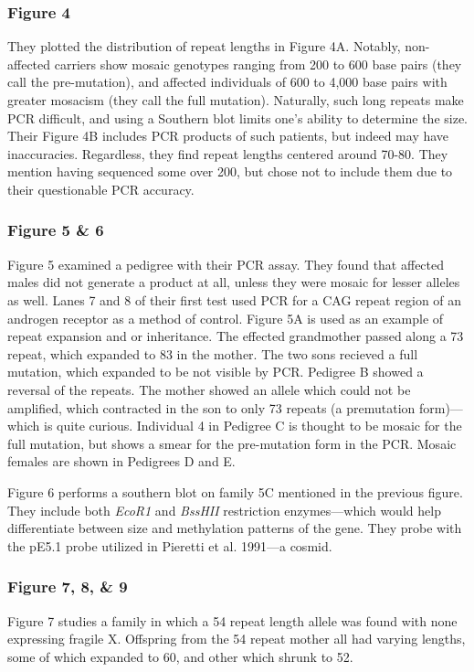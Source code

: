 \documentclass[12pt]{report}
\begin{document}
\subsubsection{Figure 4} 
They plotted the distribution of repeat lengths in Figure 4A. Notably, non-affected carriers show mosaic genotypes ranging from 200 to 600 base pairs (they call the pre-mutation), and affected individuals of 600 to 4,000 base pairs with greater mosacism (they call the full mutation). Naturally, such long repeats make PCR difficult, and using a Southern blot limits one's ability to determine the size. Their Figure 4B includes PCR products of such patients, but indeed may have inaccuracies. Regardless, they find repeat lengths centered around 70-80. They mention having sequenced some over 200, but chose not to include them due to their questionable PCR accuracy.

\subsubsection{Figure 5 \& 6}

Figure 5 examined a pedigree with their PCR assay. They found that affected males did not generate a product at all, unless they were mosaic for lesser alleles as well. Lanes 7 and 8 of their first test used PCR for a CAG repeat region of an androgen receptor as a method of control. Figure 5A is used as an example of repeat expansion and or inheritance. The effected grandmother passed along a 73 repeat, which expanded to 83 in the mother. The two sons recieved a full mutation, which expanded to be not visible by PCR. Pedigree B showed a reversal of the repeats. The mother showed an allele which could not be amplified, which contracted in the son to only 73 repeats (a premutation form)---which is quite curious. Individual 4 in Pedigree C is thought to be mosaic for the full mutation, but shows a smear for the pre-mutation form in the PCR. Mosaic females are shown in Pedigrees D and E.\newline

Figure 6 performs a southern blot on family 5C mentioned in the previous figure. They include both \textit{EcoR1} and \textit{BssHII} restriction enzymes---which would help differentiate between size and methylation patterns of the gene. They probe with the pE5.1 probe utilized in Pieretti et al. 1991---a cosmid. 

\subsubsection{Figure 7, 8, \& 9}
Figure 7 studies a family in which a 54 repeat length allele was found with none expressing fragile X. Offspring from the 54 repeat mother all had varying lengths, some of which expanded to 60, and other which shrunk to 52.\newline
\end{document}
